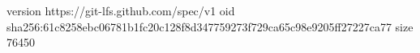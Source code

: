 version https://git-lfs.github.com/spec/v1
oid sha256:61c8258ebc06781b1fc20c128f8d347759273f729ca65c98e9205ff27227ca77
size 76450
